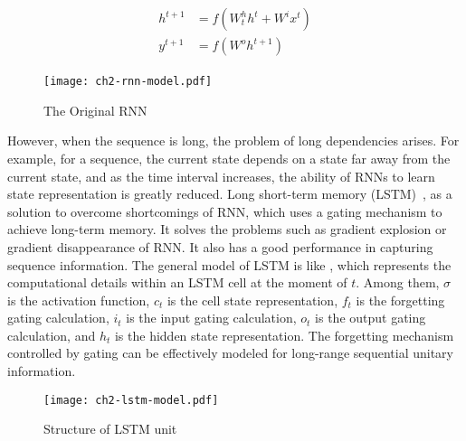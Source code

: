 \begin{align}\label{fml:rnn-train}
    \begin{split}
        h^{t+1} & =f(W^h_{t} h^t+W^i x^t) \\
        y^{t+1} & =f(W^o h^{t+1})
    \end{split}
\end{align}


\begin{figure}[htb]
    \centering
    \texttt{[image: ch2-rnn-model.pdf]}
    \caption{The Original RNN}\label{fig:ch2-rnn-model}
\end{figure}


However, when the sequence is long, the problem of long dependencies arises. For example, for a sequence, the current state depends on a state far away from the current state, and as the time interval increases, the ability of RNNs to learn state representation is greatly reduced. Long short-term memory (LSTM)~\cite{lstm1997, lindemann2020survey}, as a solution to overcome shortcomings of RNN, which uses a gating mechanism to achieve long-term memory. It solves the problems such as gradient explosion or gradient disappearance of RNN. It also has a good performance in capturing sequence information. The general model of LSTM is like \figname{\ref{fig:ch2-lstm-model}}, which represents the computational details within an LSTM cell at the moment of \(t\). Among them, \(\sigma\) is the activation function, \(c_t\) is the cell state representation, \(f_t\) is the forgetting gating calculation, \(i_t\) is the input gating calculation, \(o_t\) is the output gating calculation, and \(h_t\) is the hidden state representation. The forgetting mechanism controlled by gating can be effectively modeled for long-range sequential unitary information.

\begin{figure}[htb]
    \centering
    \texttt{[image: ch2-lstm-model.pdf]}
    \caption{Structure of LSTM unit}\label{fig:ch2-lstm-model}
\end{figure}

